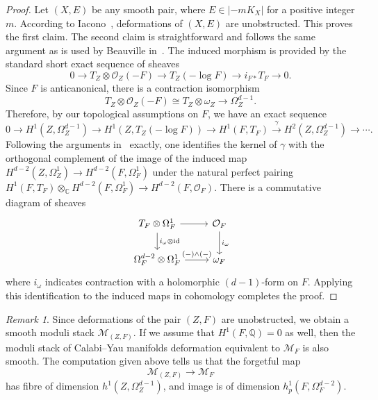 \documentclass[10pt]{amsart}
\numberwithin{equation}{section}
\theoremstyle{plain}
\theoremstyle{definition}
\theoremstyle{remark}
\newtheorem{remark}[theorem]{Remark}
\begin{document}
\begin{proof}
  Let \((X,E)\) be any smooth pair, where \(E \in |-mK_X|\) for a positive integer \(m\). According to Iacono~\cite[Corollary 4.8]{iacono2015deformations}, deformations of \((X,E)\) are unobstructed. This proves the first claim.  The second claim is straightforward and follows the same argument as is used by Beauville in~\cite[\S 3]{beauvillefano}. The induced morphism is provided by the standard short exact sequence of sheaves
  \[
    0 \rightarrow T_Z\otimes \mathcal{O}_Z(-F) \rightarrow T_Z(-\log F) \rightarrow i_{F*}T_F \rightarrow 0.
  \]
  Since \(F\) is anticanonical, there is a contraction isomorphism
  \[
    T_Z \otimes \mathcal{O}_Z(-F)\cong T_Z\otimes \omega_Z \rightarrow \Omega_Z^{d-1}.
  \]
  Therefore, by our topological assumptions on \(F\), we have an exact sequence
  \[
    0 \rightarrow H^1(Z,\Omega_Z^{d-1}) \rightarrow H^1(Z,T_Z(-\log F )) \rightarrow H^1(F,T_F) \xrightarrow{\gamma} H^2(Z,\Omega_Z^{d-1})\rightarrow  \cdots.
  \]
  Following the arguments in~\cite[Section 3]{beauvillefano} exactly, one identifies the kernel of \(\gamma\) with the orthogonal complement of the image of the induced map \(H^{d-2}(Z,\Omega_Z^{1})\rightarrow H^{d-2}(F,\Omega^{1}_F)\) under the natural perfect pairing \(H^1(F,T_F)\otimes_\mathbb{C} H^{d-2}(F,\Omega_F^1)\rightarrow H^{d-2}(F,\mathcal{O}_F)\). There is a commutative diagram of sheaves
  \[
    \begin{tikzcd}
      T_F \otimes \Omega^{1}_F \ar[r] \ar[d,"i_\omega \otimes \mathrm{id}"] & \mathcal{O}_F \ar[d,"i_\omega"]  \\
      \Omega^{d-2}_F \otimes \Omega_F^1 \ar[r,"(-)\wedge(-)"] & \omega_F
    \end{tikzcd}
  \]
  where \(i_\omega\) indicates contraction with a holomorphic \((d-1)\)-form on \(F\). Applying this identification to the induced maps in cohomology completes the proof.
\end{proof}

\begin{remark}
  Since deformations of the pair \((Z,F)\) are unobstructed, we obtain a smooth moduli stack \(\mathcal{M}_{(Z,F)}\). If we assume that \(H^1(F,\mathbb{Q}) = 0\) as well, then the moduli stack of Calabi--Yau manifolds deformation equivalent to \(\mathcal{M}_F\) is also smooth. The computation given above tells us that the forgetful map
  \[
    \mathcal{M}_{(Z,F)}\rightarrow \mathcal{M}_F
  \]
  has fibre of dimension \(h^{1}(Z,\Omega^{d-1}_Z)\), and image is of dimension \(h^1_p(F,\Omega_F^{d-2})\).
\end{remark}
\end{document}
